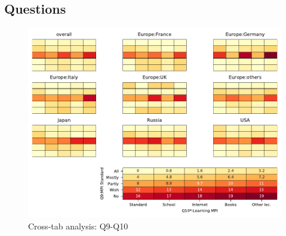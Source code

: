 
\subsection{Questions}


\begin{figure}
\begin{center}
\includegraphics[width=12cm]{../pdfs/Q9-Q10.pdf}
\caption{Cross-tab analysis: Q9-Q10}
\label{fig:Q9-Q10}
\end{center}
\end{figure}
